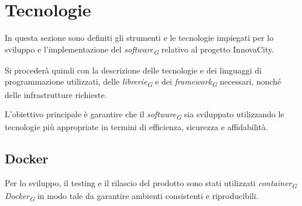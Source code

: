 \section{Tecnologie}
In questa sezione sono definiti gli strumenti e le tecnologie impiegati per lo sviluppo e l'implementazione del \textit{software}\textsubscript{\textit{G}} relativo al progetto InnovaCity.

Si procederà quindi con la descrizione delle tecnologie e dei linguaggi di programmazione utilizzati, delle \textit{librerie}\textsubscript{\textit{G}} e dei \textit{framework}\textsubscript{\textit{G}} necessari, nonché delle infrastrutture richieste.

L'obiettivo principale è garantire che il \textit{software}\textsubscript{\textit{G}} sia sviluppato utilizzando le tecnologie più appropriate in termini di efficienza, sicurezza e affidabilità.

\subsection{Docker}\label{sec:docker}
Per lo sviluppo, il testing e il rilascio del prodotto sono stati utilizzati \textit{container}\textsubscript{\textit{G}} \textit{Docker}\textsubscript{\textit{G}} in modo tale da garantire ambienti consistenti e riproducibili.

